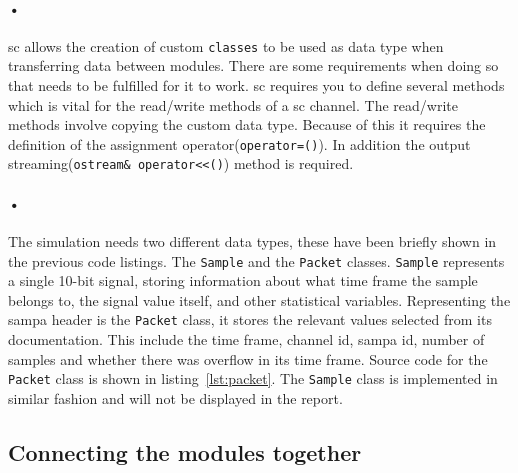 \documentclass[a4paper, 12pt]{report}\dfrac{\right }{•}
\newcommand{\codeword}[1]{\texttt{#1}}
\begin{document}
\paragraph{•}
\gls{sc} allows the creation of custom \codeword{classes} to be used as data type when transferring data between modules.
There are some requirements when doing so that needs to be fulfilled for it to work.
\gls{sc} requires you to define several methods which is vital for the read/write methods of a \gls{sc} channel.
The read/write methods involve copying the custom data type.
Because of this it requires the definition of the assignment operator(\codeword{operator=()}).
In addition the output streaming(\codeword{ostream\& operator<<()}) method is required. 

\paragraph{•}
The simulation needs two different data types, these have been briefly shown in the previous code listings.
The \codeword{Sample} and the \codeword{Packet} classes.
\codeword{Sample} represents a single 10-bit signal, storing information about what time frame the sample belongs to, the signal value itself, and other statistical variables.
Representing the \gls{sampa} header is the \codeword{Packet} class, it stores the relevant values selected from its documentation.
This include the time frame, channel id, sampa id, number of samples and whether there was overflow in its time frame.
Source code for the \codeword{Packet} class is shown in listing~\ref{lst:packet}.
The \codeword{Sample} class is implemented in similar fashion and will not be displayed in the report. 

\begin{minipage}{\linewidth}

\end{minipage}

\subsection{Connecting the modules together}
\end{document}
